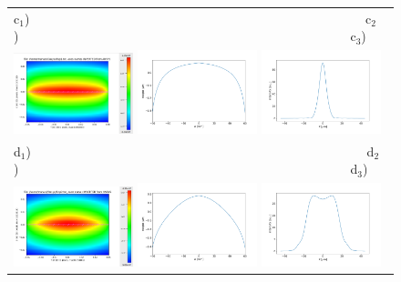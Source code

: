 \documentclass[aps,pra,showpacs,twocolumn,amsmath,amssymb,superscriptaddress,nofootinbib]{revtex4}
\begin{document}
\begin{figure}
\begin{center}
\begin{tabular}{l}
   c$_1$)~~~~~~~~~~~~~~~~~~~~~~~~~~~~~~~~~~~~~~~~~~~~~~~~~~~~
   c$_2$)~~~~~~~~~~~~~~~~~~~~~~~~~~~~~~~~~~~~~~~~~~~~~~~~~~~~c$_3$)\\ 
   \includegraphics[width=0.32\textwidth]{figures/water1_2d.png}
   \includegraphics[width=0.32\textwidth]{figures/deformation3.png}   
   \includegraphics[width=0.32\textwidth]{figures/intensity3.png} \\

   
   d$_1$)~~~~~~~~~~~~~~~~~~~~~~~~~~~~~~~~~~~~~~~~~~~~~~~~~~~~
   d$_2$)~~~~~~~~~~~~~~~~~~~~~~~~~~~~~~~~~~~~~~~~~~~~~~~~~~~~d$_3$)\\
   \includegraphics[width=0.32\textwidth]{figures/water2_2d.png} 
   \includegraphics[width=0.32\textwidth]{figures/deformation4.png} 
   \includegraphics[width=0.32\textwidth]{figures/intensity4.png}\\
   
   \end{tabular}
  \end{center}
  
   \end{figure} 
\end{document}
